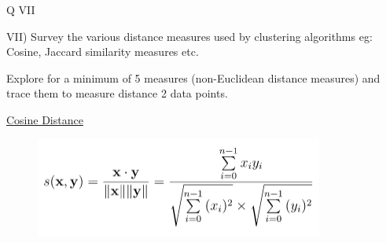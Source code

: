 \documentclass[12pt]{article}
\renewcommand{\_}{\kern-1.5pt\textunderscore\kern-1.5pt}
\begin{document}

\par


\vspace{\baselineskip}

\vspace{\baselineskip}

\vspace{\baselineskip}

\vspace{\baselineskip}

\vspace{\baselineskip}

\vspace{\baselineskip}

\vspace{\baselineskip}

\vspace{\baselineskip}
\begin{Center}
{\fontsize{28pt}{33.6pt}\selectfont Q VII\par}
\end{Center}\par

{\fontsize{14pt}{16.8pt}\selectfont VII) Survey the various distance measures used by clustering algorithms eg: Cosine, Jaccard similarity measures etc.\par}\par

{\fontsize{14pt}{16.8pt}\selectfont Explore for a minimum of 5 measures (non-Euclidean distance measures) and trace them to measure distance 2 data points.\par}\par


\vspace{\baselineskip}
{\fontsize{14pt}{16.8pt}\selectfont \uline{Cosine Distance}\par}\par




\begin{figure}[H]
	\begin{Center}
		\includegraphics[width=3.73in,height=1.3in]{./media/image8.png}
	\end{Center}
\end{figure}
\end{document}
